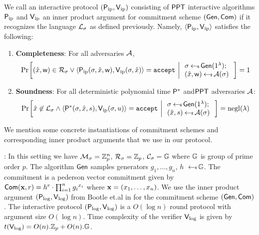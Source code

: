 \begin{definition}\label{defn:innerproductarg}
We call an interactive protocol $(\mathsf{P}_\mathrm{ip},\mathsf{V}_\mathrm{ip})$ consisting of $\mathsf{PPT}$ interactive algorithms $\mathsf{P}_\mathrm{ip}$ and $\mathsf{V}_\mathrm{ip}$ an inner product argument for commitment scheme $(\mathsf{Gen},\mathsf{Com})$ if it recognizes the language $\mathcal{L}_\sigma$ as defined previously. Namely, $\langle \mathsf{P}_\mathrm{ip},\mathsf{V}_\mathrm{ip}\rangle$ satisfies the following:
\begin{enumerate}[{\rm (i)}]
\item {\bf Completeness}: For all adversaries $\mathcal{A}$,
\begin{align*}
\condprob{(\stmt,\wit)\in \calR_\sigma \vee \langle \pip(\sigma,\stmt,\wit),\vip(\sigma,\stmt)\rangle={\tt accept}}{
\begin{array}{l}
\sigma\sample \gen(\secparam);\\
(\stmt,\wit)\sample \adv(\sigma)
\end{array}
}=1
\end{align*}

\item{\bf Soundness}: For all deterministic polynomial time $\mathsf{P}^*$ and$\mathsf{PPT}$ adversaries $\mathcal{A}$:
\begin{align*}
\condprob{\stmt\not\in \calL_\sigma \wedge \langle
\prover^*(\sigma,\stmt,s),\vip(\sigma,u)\rangle={\tt accept}}{
\begin{array}{l}
\sigma\sample \gen(\secparam);\\
(\stmt,s)\sample \adv(\sigma)
\end{array}
} = \negl(\lambda)
\end{align*}
\end{enumerate}
\end{definition}

We mention some concrete instantiations of commitment schemes and corresponding inner product arguments that we use in our protocol.

: In this setting we have $\mathcal{M}_\sigma=\mathbb{Z}^n_p$, $\mathcal{R}_\sigma=\mathbb{Z}_p$, $\mathcal{C}_\sigma=\mathbb{G}$ where $\mathbb{G}$ is group of prime order $p$. The algorithm $\mathsf{Gen}$ samples generators $g_1,\ldots,g_n$, $h$ $\hskip2.3pt{\gets\!\!\mbox{\tiny${\$}$\normalsize}}\, \mathbb{G}$. The commitment is a pederson vector commitment given by $\mathsf{Com}({\bf x } ,r ) = h^r \cdot \prod_{i=1}^n {g_i}^{x_i}$ where ${\bf x}=(x_1,\ldots,x_n)$. We use the inner product argument $(\mathsf{P}_\mathrm{log},\mathsf{V}_\mathrm{log})$ from Bootle et.al in \cite{Bulletproofs} for the commitment scheme $(\mathsf{Gen},\mathsf{Com})$. The interactive protocol $(\mathsf{P}_\mathrm{log},\mathsf{V}_\mathrm{log})$ is a $O(\log n)$ round protocol with argument size $O(\log n)$. Time complexity of the verifier $\mathsf{V}_\mathrm{log}$ is given by $t(\mathsf{V}_\mathrm{log})=O(n).\mathbb{Z}_p + O(n).\mathbb{G}$.\smallskip


